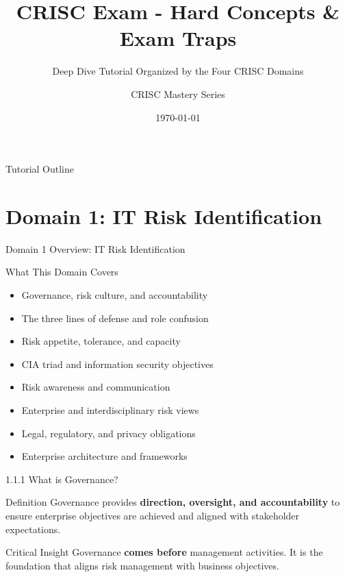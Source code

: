 \documentclass{beamer}
\title{CRISC Exam - Hard Concepts \& Exam Traps}
\subtitle{Deep Dive Tutorial Organized by the Four CRISC Domains}
\author{CRISC Mastery Series}
\date{\today}
\begin{document}
	
	\begin{frame}
		\titlepage
	\end{frame}
	
	\begin{frame}{Tutorial Outline}
		\tableofcontents
	\end{frame}
	
	
	\section{Domain 1: IT Risk Identification}
	
	\begin{frame}{Domain 1 Overview: IT Risk Identification}
		\begin{block}{What This Domain Covers}
			\begin{itemize}
				\item Governance, risk culture, and accountability
				\item The three lines of defense and role confusion
				\item Risk appetite, tolerance, and capacity
				\item CIA triad and information security objectives
				\item Risk awareness and communication
				\item Enterprise and interdisciplinary risk views
				\item Legal, regulatory, and privacy obligations
				\item Enterprise architecture and frameworks
			\end{itemize}
		\end{block}
	\end{frame}
	
	\begin{frame}{1.1.1 What is Governance?}
		\begin{block}{Definition}
			Governance provides \textbf{direction, oversight, and accountability} to ensure enterprise objectives are achieved and aligned with stakeholder expectations.
		\end{block}
		\begin{alertblock}{Critical Insight}
			Governance \textbf{comes before} management activities. It is the foundation that aligns risk management with business objectives.
		\end{alertblock}
	\end{frame}
	
\end{document}
